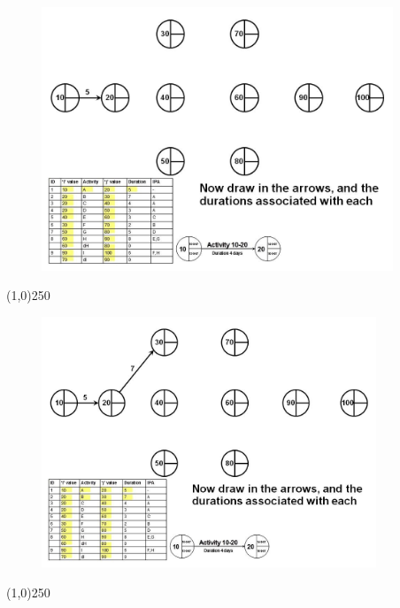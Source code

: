 \begin{frame}
\begin{figure}
	\centering
		\includegraphics[width = 10.5cm]{oldnotes/Slide91.jpg}
\end{figure}
\end{frame}
\begin{center}\line(1,0){250}\end{center}


\begin{frame}
\begin{figure}
	\centering
		\includegraphics[width = 10.0cm]{oldnotes/Slide92.jpg}
\end{figure}
\end{frame}
\begin{center}\line(1,0){250}\end{center}


